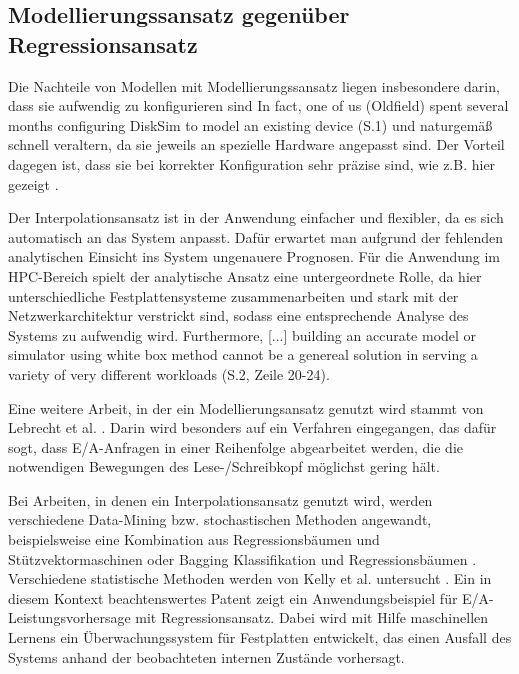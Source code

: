 \documentclass[
	12pt,
	a4paper,
	BCOR10mm,
	DIV14,
	listof=totoc,
	bibliography=totoc,
	headsepline
]{scrreprt}
\begin{document}
\subsection{Modellierungssansatz gegenüber Regressionsansatz}
Die Nachteile von Modellen mit Modellierungssansatz liegen insbesondere darin, dass sie aufwendig zu konfigurieren sind \glqq In fact, one of us (Oldfield) spent several months configuring DiskSim to model an existing device\grqq{} \cite{Crume:2013:FML:2538542.2538561} (S.1) und naturgemäß schnell veraltern, da sie jeweils an spezielle Hardware angepasst sind. Der Vorteil dagegen ist, dass sie bei korrekter Konfiguration sehr präzise sind, wie z.B. hier gezeigt \cite{Ruemmler94anintroduction}.

Der Interpolationsansatz ist in der Anwendung einfacher und flexibler, da es sich automatisch an das System anpasst. Dafür erwartet man aufgrund der fehlenden analytischen Einsicht ins System ungenauere Prognosen. Für die Anwendung im HPC-Bereich spielt der analytische Ansatz eine untergeordnete Rolle, da hier unterschiedliche Festplattensysteme zusammenarbeiten und stark mit der Netzwerkarchitektur verstrickt sind, sodass eine entsprechende Analyse des Systems zu aufwendig wird. \glqq Furthermore, [...] building an accurate model or simulator using white box method cannot be a genereal solution in serving a variety of very different workloads\grqq{} \cite{DBLP:conf/npc/ZhangLZJC10} (S.2, Zeile 20-24).

Eine weitere Arbeit, in der ein Modellierungsansatz genutzt wird stammt von Lebrecht et al. \cite{Lebrecht:2009:10.1109/QEST.2009.31}. Darin wird besonders auf ein Verfahren eingegangen, das dafür sogt, dass E/A-Anfragen in einer Reihenfolge abgearbeitet werden, die die notwendigen Bewegungen des Lese-/Schreibkopf möglichst gering hält.

Bei Arbeiten, in denen ein Interpolationsansatz genutzt wird, werden verschiedene Data-Mining bzw. stochastischen Methoden angewandt, beispielsweise eine Kombination aus Regressionsbäumen und Stützvektormaschinen \cite{Dai:2012:SDP:2477169.2477214} oder Bagging Klassifikation und Regressionsbäumen \cite{DBLP:conf/npc/ZhangLZJC10}. Verschiedene statistische Methoden werden von Kelly et al. untersucht \cite{Kelly04inducingmodels}.
Ein in diesem Kontext beachtenswertes Patent \cite{gough2012predicting} zeigt ein Anwendungsbeispiel für E/A-Leistungsvorhersage mit Regressionsansatz. Dabei wird mit Hilfe maschinellen Lernens ein Überwachungssystem für Festplatten entwickelt, das einen Ausfall des Systems anhand der beobachteten internen Zustände vorhersagt. 
\end{document}

